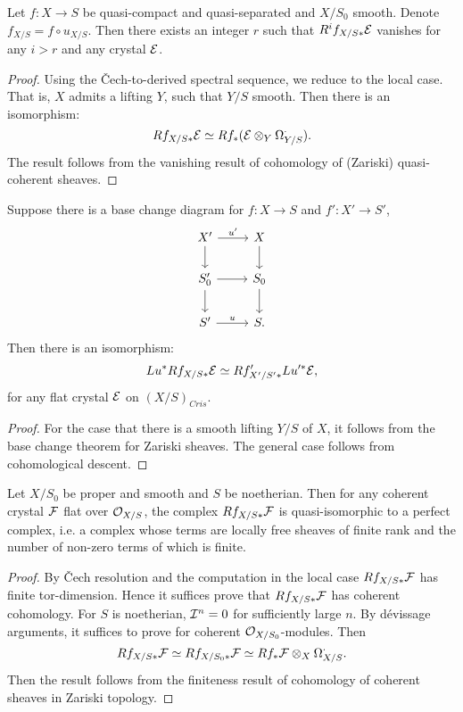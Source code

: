 \begin{theorem}
    Let $f \colon X \to S$ be quasi-compact 
    and quasi-separated and $X/S_0$ smooth. 
    Denote $f_{X/S} = f \circ u_{X/S}$. 
    Then there exists an integer $r$ such that 
    $R^i f_{X/S*} {\mathcal {E}}$ vanishes for any $i>r$ and any crystal ${\mathcal {E}}$.
\end{theorem}

\begin{proof}
    Using the \v Cech-to-derived spectral sequence, 
    we reduce to the local case. 
    That is, $X$ admits a lifting $Y$, such that $Y/S$ smooth. 
    Then there is an isomorphism:
    \[
        Rf_{X/S*} {\mathcal {E}} \simeq Rf_* ({\mathcal {E}} \otimes_Y \Omega_{Y/S}^\cdot).
    \]
    The result follows from the vanishing result of 
    cohomology of (Zariski) quasi-coherent sheaves.
\end{proof}
\begin{theorem}
    Suppose there is a base change diagram for 
    $f \colon X \to S$ and $f' \colon X' \to S'$,
    \[
        \begin{tikzcd}
            X' \ar[r,"{u'}"] \ar[d] & X \ar[d] \\
            S_0' \ar[r] \ar[d] & S_0 \ar[d] \\
            S' \ar[r,"u"] & S.
        \end{tikzcd}
    \]
    Then there is an isomorphism:
    \[
        Lu^* Rf_{X/S*} {\mathcal {E}} \simeq Rf'_{X'/S'*} Lu'^*{\mathcal {E}},
    \]
    for any flat crystal ${\mathcal {E}}$ on $(X/S)_{Cris}$.
\end{theorem}

\begin{proof}
    For the case that there is a smooth lifting $Y/S$ of $X$, 
    it follows from the base change theorem for Zariski sheaves. 
    The general case follows from cohomological descent.
\end{proof}

\begin{theorem}
    Let $X/S_0$ be proper and smooth and $S$ be noetherian. 
    Then for any coherent crystal ${\mathcal {F}}$ flat over ${\mathcal {O}}_{X/S}$, 
    the complex $Rf_{X/S*}{\mathcal {F}}$ is quasi-isomorphic to a perfect complex, 
    i.e. a complex whose terms are locally free sheaves of finite rank 
    and the number of non-zero terms of which is finite.
\end{theorem}

\begin{proof}
    By \v Cech resolution and the computation in the local case 
    $Rf_{X/S*} {\mathcal {F}}$ has finite tor-dimension. 
    Hence it suffices prove that $Rf_{X/S*} {\mathcal {F}}$ has coherent cohomology. 
    For $S$ is noetherian, ${\mathcal {I}}^n = 0$ for sufficiently large $n$. 
    By d\'evissage arguments, 
    it suffices to prove for coherent ${\mathcal {O}}_{X/S_0}$-modules. 
    Then 
    \[
        Rf_{X/S*} {\mathcal {F}} \simeq Rf_{X/S_0*} {\mathcal {F}} 
        \simeq Rf_* {\mathcal {F}} \otimes_X \Omega_{X/S}^\cdot.
    \]
    Then the result follows from the finiteness result 
    of cohomology of coherent sheaves in Zariski topology.
\end{proof}

